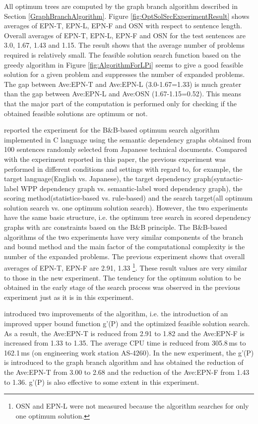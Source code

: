 All optimum trees are computed by the graph branch algorithm described
in Section
\ref{GraphBranchAlgorithm}. Figure \ref{fig:OptSolSrcExperimentResult}
shows averages of EPN-T, EPN-L, EPN-F and OSN with respect to sentence
length. Overall averages of EPN-T, EPN-L, EPN-F and OSN for the test
sentences are 3.0, 1.67, 1.43 and 1.15. The result shows that the
average number of problems required is relatively small. The feasible
solution search function based on the greedy algorithm in
Figure \ref{fig:AlgorithmForLPi} seems to give a good feasible solution
for a given problem and suppresses the number of expanded problems. The gap
between Ave:EPN-T and Ave:EPN-L (3.0-1.67=1.33) is much greater than
the gap between Ave:EPN-L and Ave:OSN (1.67-1.15=0.52). This means that
the major part of the computation is performed only for checking if
the obtained feasible solutions are optimum or not.


\cite{Hirakawa01} reported the experiment for the B\&B-based optimum
search algorithm implemented in C language using the semantic
dependency graphs obtained from 100 sentences randomly selected from
Japanese technical documents. Compared with the experiment reported in
this paper, the previous experiment was performed in different
conditions and settings with regard to, for example, the target
language(English vs. Japanese), the target dependency
graph(syntactic-label WPP dependency graph vs. semantic-label word
dependency graph), the scoring method(statistics-based vs. rule-based)
and the search target(all optimum solution search vs. one optimum
solution search). However, the two experiments have the same basic
structure, i.e. the optimum tree search in scored dependency graphs
with arc constraints based on the B\&B principle. The B\&B-based
algorithms of the two experiments have very similar components of the
branch and bound method and the main factor of the computational
complexity is the number of the expanded problems. The previous
experiment shows that overall averages of EPN-T, EPN-F are 2.91, 1.33
\footnote{OSN and EPN-L were not measured because the algorithm
searches for only one optimum solution.}. These result values are very
similar to those in the new experiment. The tendency for the optimum
solution to be obtained in the early stage of the search process was
observed in the previous experiment just as it is in this
experiment. 

\cite{Hirakawa01} introduced two improvements of the algorithm,
i.e. the introduction of an improved upper bound function g'(P) and
the optimized feasible solution search. As a result, the Ave:EPN-T is
reduced from 2.91 to 1.82 and the Ave:EPN-F is increased from 1.33 to
1.35. The average CPU time is reduced from 305.8\,ms to 162.1\,ms (on
engineering work station AS-4260). In the new experiment, the g'(P) is
introduced to the graph branch algorithm and has obtained the
reduction of the Ave:EPN-T from 3.00 to 2.68 and the reduction of the
Ave:EPN-F from 1.43 to 1.36. g'(P) is also effective to some extent in
this experiment.

